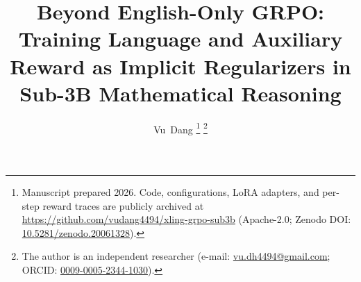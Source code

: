 \documentclass[journal,onecolumn,11pt]{IEEEtran}
\begin{document}
\title{Beyond English-Only GRPO: Training Language and Auxiliary Reward
       as Implicit Regularizers in Sub-3B Mathematical Reasoning}

\author{Vu~Dang%
\thanks{Manuscript prepared 2026. Code, configurations, LoRA adapters, and
per-step reward traces are publicly archived at
\url{https://github.com/vudang4494/xling-grpo-sub3b}
(Apache-2.0; Zenodo DOI: \href{https://doi.org/10.5281/zenodo.20061328}%
{10.5281/zenodo.20061328}).}%
\thanks{The author is an independent researcher
(e-mail: \href{mailto:vu.dh4494@gmail.com}{vu.dh4494@gmail.com};
ORCID: \href{https://orcid.org/0009-0005-2344-1030}{0009-0005-2344-1030}).}}


\maketitle
\end{document}
